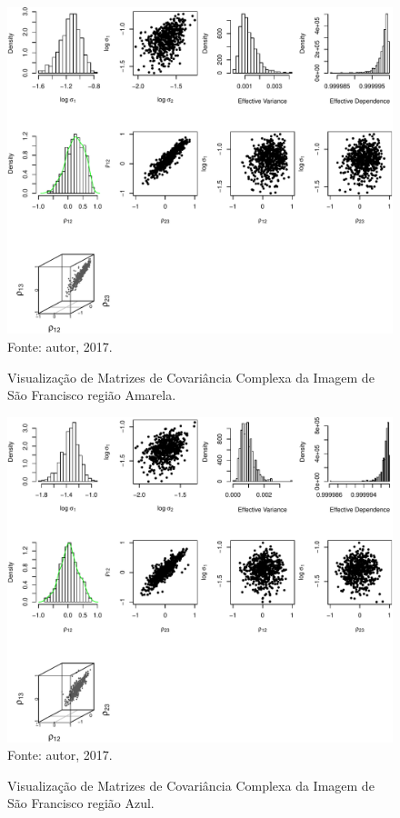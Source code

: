 \documentclass[a4paper,12pt]{article}
\begin{document}
\begin{figure}[ht]
\centering
\caption{Visualização de Matrizes de Covariância Complexa da Imagem de São Francisco região Amarela.}
\includegraphics[width=\linewidth]{../../Figuras/Amostras-SanFrancisc/SanFrancisc-Amarela-500.pdf}\\
Fonte: autor, 2017.
\label{visSanFrancisc1}
\end{figure}

\newpage

\begin{figure}[ht]
\centering
\caption{Visualização de Matrizes de Covariância Complexa da Imagem de São Francisco região Azul.}
\includegraphics[width=\linewidth]{../../Figuras/Amostras-SanFrancisc/SanFrancisc-Azul-500.pdf}\\
Fonte: autor, 2017.
\label{visSanFrancisc2}
\end{figure}
\end{document}
